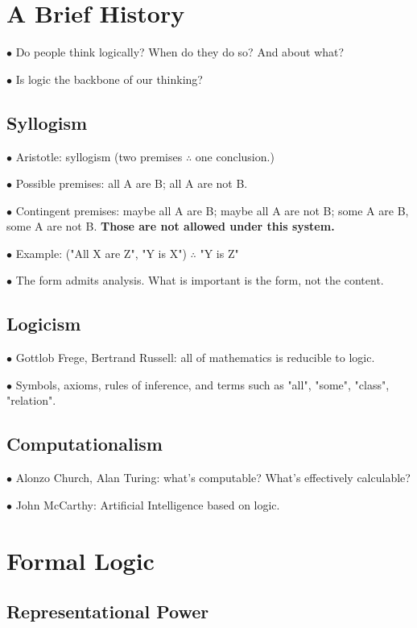 \documentclass[english,openany]{book}
\begin{document}
\section{A Brief History}

$\bullet$ Do people think logically? When do they do so? And about what?

$\bullet$ Is logic the backbone of our thinking?

\subsection{Syllogism}

$\bullet$ Aristotle: syllogism (two premises $\therefore$ one conclusion.)

$\bullet$ Possible premises: all A are B; all A are not B.

$\bullet$ Contingent premises: maybe all A are B; maybe all A are not B; some A are B, some A are not B. \textbf{Those are not allowed under this system.}

$\bullet$ Example: ("All X are Z", "Y is X") $\therefore$ "Y is Z"

$\bullet$ The form admits analysis. What is important is the form, not the content.

\subsection{Logicism}

$\bullet$ Gottlob Frege, Bertrand Russell: all of mathematics is reducible to logic.

$\bullet$ Symbols, axioms, rules of inference, and terms such as "all", "some", "class", "relation".

\subsection{Computationalism}

$\bullet$ Alonzo Church, Alan Turing: what's computable? What's effectively calculable?

$\bullet$ John McCarthy: Artificial Intelligence based on logic.

\section{Formal Logic}

\subsection{Representational Power}
\end{document}
